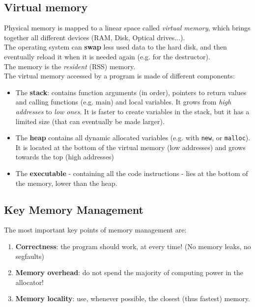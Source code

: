 \documentclass[../template.tex]{subfiles}
\begin{document}
\subsection{Virtual memory}
Physical memory is mapped to a linear space called \textit{virtual memory}, which brings together all different devices (RAM, Disk, Optical drives...).\\
The operating system can \textbf{swap}  less used  data to the hard disk, and then eventually reload it when it is needed again (e.g. for the destructor).\\
The memory  is the \textit{resident} (RSS) memory.\\

The virtual memory accessed by a program is made of different components:
\begin{itemize}
    \item The \textbf{stack}: contains function arguments (in order), pointers to return values and calling functions (e.g. main) and local variables. It grows from \textit{high addresses} to \textit{low ones}. It is faster to create variables in the stack, but it has a limited size (that can eventually be made larger).
    \item The \textbf{heap} contains all dynamic allocated variables (e.g. with \texttt{new}, or \texttt{malloc}). It is located at the bottom of the virtual memory (low addresses) and grows towards the top (high addresses)
    \item The \textbf{executable} - containing all the code instructions - lies at the bottom of the memory, lower than the heap.
\end{itemize}

\subsection{Key Memory Management}
The most important key points of memory management are:
\begin{enumerate}
    \item \textbf{Correctness}: the program should work, at every time! (No memory leaks, no segfaults)
    \item \textbf{Memory overhead}: do not spend the majority of computing power in the allocator!
    \item \textbf{Memory locality}: use, whenever possible, the closest (thus fastest) memory. 
\end{enumerate}
\end{document}

